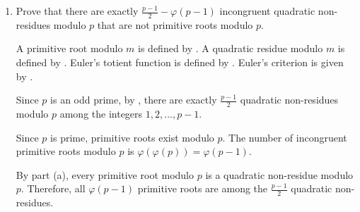 \begin{enumerate}
\begin{enumerate}
\begin{subprove}
      Let $r$ be a primitive root modulo $p$. Then, by , $\operatorname{ord}_p(r) = \varphi(p) = p-1$.
      
      It is shown that $r$ is a quadratic non-residue modulo $p$ by contradiction.
      Suppose, for the sake of contradiction, that $r$ is a quadratic residue modulo $p$.
      Then, by , there exists $x \in \mathbb{Z}$ such that $x^2 \equiv r \pmod{p}$.
      Since $r$ is a primitive root, it follows that $\gcd(r, p) = 1$, so $\gcd(x, p) = 1$ as well.
      Therefore,
      \[
      r^{(p-1)/2} \equiv (x^2)^{(p-1)/2} = x^{p-1} \equiv 1 \pmod{p}
      \]
      by .
      However, since $\operatorname{ord}_p(r) = p-1$ and $(p-1)/2 < p-1$, it follows that $r^{(p-1)/2} \not\equiv 1 \pmod{p}$.
      This is a contradiction.
      Therefore, $r$ is not a quadratic residue modulo $p$, so $r$ is a quadratic non-residue modulo $p$.
      
      Since $r$ is a quadratic non-residue modulo $p$, by , it follows that $\left(\frac{r}{p}\right) = -1$.
      By  (Euler's criterion), it follows that
      \[
      r^{(p-1)/2} \equiv \left(\frac{r}{p}\right) = -1 \pmod{p}.
      \]
      Therefore, $r^{(p-1)/2} \equiv -1 \pmod{p}$.
    \end{subprove}
    
    \item Prove that there are exactly $\frac{p-1}{2}-\varphi(p-1)$ incongruent quadratic non-residues 
    modulo $p$ that are not primitive roots modulo $p$.
    \begin{subprove}
      A primitive root modulo $m$ is defined by .
      A quadratic residue modulo $m$ is defined by .
      Euler's totient function is defined by .
      Euler's criterion is given by .
      
      Since $p$ is an odd prime, by , there are exactly $\frac{p-1}{2}$ quadratic non-residues modulo $p$ among the integers $1, 2, \ldots, p-1$.
      
      Since $p$ is prime, primitive roots exist modulo $p$. The number of incongruent primitive roots modulo $p$ is $\varphi(\varphi(p)) = \varphi(p-1)$.
      
      By part (a), every primitive root modulo $p$ is a quadratic non-residue modulo $p$.
      Therefore, all $\varphi(p-1)$ primitive roots are among the $\frac{p-1}{2}$ quadratic non-residues.
      

\end{subprove}
\end{enumerate}
\end{enumerate}
